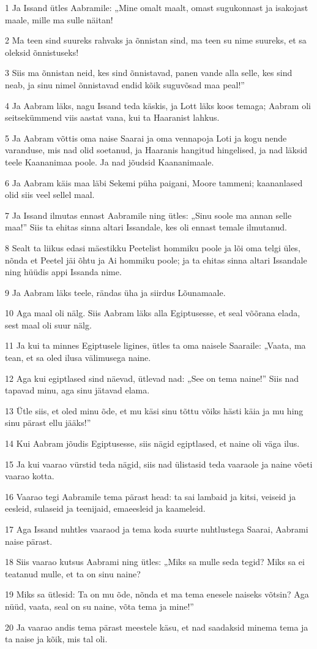 \par 1 Ja Issand ütles Aabramile: „Mine omalt maalt, omast sugukonnast ja isakojast maale, mille ma sulle näitan!
\par 2 Ma teen sind suureks rahvaks ja õnnistan sind, ma teen su nime suureks, et sa oleksid õnnistuseks!
\par 3 Siis ma õnnistan neid, kes sind õnnistavad, panen vande alla selle, kes sind neab, ja sinu nimel õnnistavad endid kõik suguvõsad maa peal!”
\par 4 Ja Aabram läks, nagu Issand teda käskis, ja Lott läks koos temaga; Aabram oli seitsekümmend viis aastat vana, kui ta Haaranist lahkus.
\par 5 Ja Aabram võttis oma naise Saarai ja oma vennapoja Loti ja kogu nende varanduse, mis nad olid soetanud, ja Haaranis hangitud hingelised, ja nad läksid teele Kaananimaa poole. Ja nad jõudsid Kaananimaale.
\par 6 Ja Aabram käis maa läbi Sekemi püha paigani, Moore tammeni; kaananlased olid siis veel sellel maal.
\par 7 Ja Issand ilmutas ennast Aabramile ning ütles: „Sinu soole ma annan selle maa!” Siis ta ehitas sinna altari Issandale, kes oli ennast temale ilmutanud.
\par 8 Sealt ta liikus edasi mäestikku Peetelist hommiku poole ja lõi oma telgi üles, nõnda et Peetel jäi õhtu ja Ai hommiku poole; ja ta ehitas sinna altari Issandale ning hüüdis appi Issanda nime.
\par 9 Ja Aabram läks teele, rändas üha ja siirdus Lõunamaale.
\par 10 Aga maal oli nälg. Siis Aabram läks alla Egiptusesse, et seal võõrana elada, sest maal oli suur nälg.
\par 11 Ja kui ta minnes Egiptusele ligines, ütles ta oma naisele Saaraile: „Vaata, ma tean, et sa oled ilusa välimusega naine.
\par 12 Aga kui egiptlased sind näevad, ütlevad nad: „See on tema naine!” Siis nad tapavad minu, aga sinu jätavad elama.
\par 13 Ütle siis, et oled minu õde, et mu käsi sinu tõttu võiks hästi käia ja mu hing sinu pärast ellu jääks!”
\par 14 Kui Aabram jõudis Egiptusesse, siis nägid egiptlased, et naine oli väga ilus.
\par 15 Ja kui vaarao vürstid teda nägid, siis nad ülistasid teda vaaraole ja naine võeti vaarao kotta.
\par 16 Vaarao tegi Aabramile tema pärast head: ta sai lambaid ja kitsi, veiseid ja eesleid, sulaseid ja teenijaid, emaeesleid ja kaameleid.
\par 17 Aga Issand nuhtles vaaraod ja tema koda suurte nuhtlustega Saarai, Aabrami naise pärast.
\par 18 Siis vaarao kutsus Aabrami ning ütles: „Miks sa mulle seda tegid? Miks sa ei teatanud mulle, et ta on sinu naine?
\par 19 Miks sa ütlesid: Ta on mu õde, nõnda et ma tema enesele naiseks võtsin? Aga nüüd, vaata, seal on su naine, võta tema ja mine!”
\par 20 Ja vaarao andis tema pärast meestele käsu, et nad saadaksid minema tema ja ta naise ja kõik, mis tal oli.

